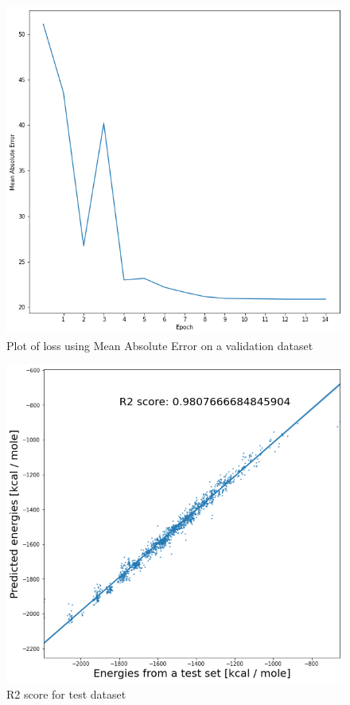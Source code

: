 \documentclass[a4paper,oneside,openright,11pt]{book}
\begin{document}
\begin{figure}[h!]
\centering
\includegraphics[scale=0.8]{DocumentFigures/ZdjeciaWalidacja/Lossvalidation.png}
\caption{Plot of loss using Mean Absolute Error on a validation dataset}
\end{figure}



\begin{figure}[h!]
\centering
\includegraphics[scale=0.7]{DocumentFigures/ZdjeciaWalidacja/R2test.png}
\caption{R2 score for test dataset}
\end{figure}
\end{document}
